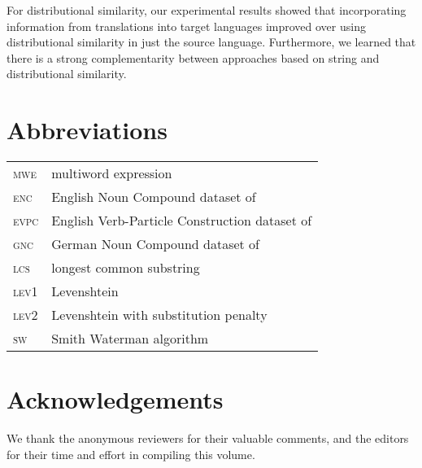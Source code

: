 \documentclass[output=paper
,modfonts
,nonflat]{langsci/langscibook}
\begin{document}
For distributional similarity, our experimental results showed that
incorporating information from translations into target languages
improved over using distributional similarity in just the source
language. Furthermore, we learned that there is a strong
complementarity between approaches based on string and distributional
similarity.






\section*{Abbreviations}

\begin{tabularx}{.48\textwidth}{ll}
   \textsc{mwe} & multiword expression  \\
  \textsc{enc} &  English Noun Compound dataset of \citet{reddy2011a}  \\
\textsc{evpc} &  English Verb-Particle Construction dataset of \citet{bannard2003}  \\
\textsc{gnc}  &  German Noun Compound dataset of \citet{SchulteImWalde+:2013} \\
 \textsc{lcs} &   longest common substring  \\
  \textsc{lev1} &  Levenshtein  \\
  \textsc{lev2} &  Levenshtein with substitution penalty \\
 \textsc{sw}  & Smith Waterman algorithm  \\
  \end{tabularx}


\section*{Acknowledgements}
We thank the anonymous reviewers for their valuable
comments, and the editors for their time and effort in compiling
this volume.

{\sloppy
\printbibliography[heading=subbibliography,notkeyword=this]
}
\end{document}
